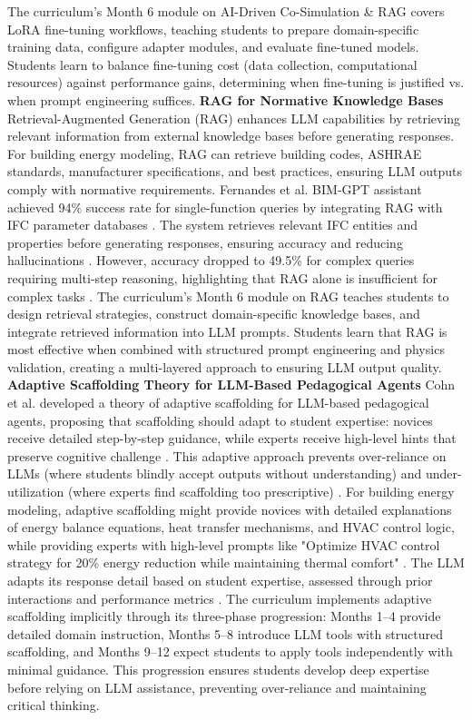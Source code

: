 \documentclass[12pt,a4paper]{article}
\begin{document}
The curriculum's Month 6 module on AI-Driven Co-Simulation \& RAG covers LoRA fine-tuning workflows, teaching students to prepare domain-specific training data, configure adapter modules, and evaluate fine-tuned models. Students learn to balance fine-tuning cost (data collection, computational resources) against performance gains, determining when fine-tuning is justified vs. when prompt engineering suffices.
\textbf{RAG for Normative Knowledge Bases}
Retrieval-Augmented Generation (RAG) enhances LLM capabilities by retrieving relevant information from external knowledge bases before generating responses. For building energy modeling, RAG can retrieve building codes, ASHRAE standards, manufacturer specifications, and best practices, ensuring LLM outputs comply with normative requirements.
Fernandes et al. BIM-GPT assistant achieved 94\% success rate for single-function queries by integrating RAG with IFC parameter databases \cite{ref9}. The system retrieves relevant IFC entities and properties before generating responses, ensuring accuracy and reducing hallucinations \cite{ref9}. However, accuracy dropped to 49.5\% for complex queries requiring multi-step reasoning, highlighting that RAG alone is insufficient for complex tasks \cite{ref9}.
The curriculum's Month 6 module on RAG teaches students to design retrieval strategies, construct domain-specific knowledge bases, and integrate retrieved information into LLM prompts. Students learn that RAG is most effective when combined with structured prompt engineering and physics validation, creating a multi-layered approach to ensuring LLM output quality.
\textbf{Adaptive Scaffolding Theory for LLM-Based Pedagogical Agents}
Cohn et al. developed a theory of adaptive scaffolding for LLM-based pedagogical agents, proposing that scaffolding should adapt to student expertise: novices receive detailed step-by-step guidance, while experts receive high-level hints that preserve cognitive challenge \cite{ref4}. This adaptive approach prevents over-reliance on LLMs (where students blindly accept outputs without understanding) and under-utilization (where experts find scaffolding too prescriptive) \cite{ref4}.
For building energy modeling, adaptive scaffolding might provide novices with detailed explanations of energy balance equations, heat transfer mechanisms, and HVAC control logic, while providing experts with high-level prompts like "Optimize HVAC control strategy for 20\% energy reduction while maintaining thermal comfort" \cite{ref4}. The LLM adapts its response detail based on student expertise, assessed through prior interactions and performance metrics \cite{ref4}.
The curriculum implements adaptive scaffolding implicitly through its three-phase progression: Months 1--4 provide detailed domain instruction, Months 5--8 introduce LLM tools with structured scaffolding, and Months 9--12 expect students to apply tools independently with minimal guidance. This progression ensures students develop deep expertise before relying on LLM assistance, preventing over-reliance and maintaining critical thinking.
\end{document}
